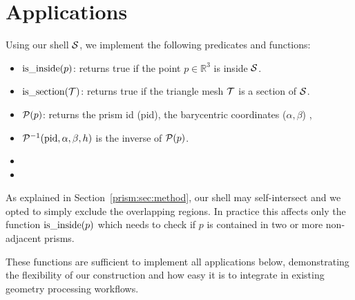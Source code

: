 \section{Applications}
\label{prism:sec:applications}
Using our shell $\S$, we implement the following predicates and functions:
\begin{itemize}
    \item $\isinside(p)$: returns true if the point $p \in \mathbb{R}^3$ is inside $\S$. %
    \item $\issection(\T)$: returns true if the triangle mesh $\T$ is a section of $\S$.
    \item $\P(p)$: returns the prism id (pid), the barycentric coordinates ($\alpha,\beta$) , 
    \item $\P^{-1}(\text{pid},\alpha,\beta,h)$ is the inverse of $\P(p)$.
    \item {}
    \item {}
\end{itemize}

As explained in Section~\ref{prism:sec:method}, our shell may self-intersect and 
we opted to simply exclude the overlapping regions. In practice this affects only the function $\isinside(p)$ which needs to check if $p$ is contained in two or more non-adjacent prisms. 

These functions are sufficient to implement all applications below, demonstrating the flexibility of our construction and how easy it is to integrate in existing geometry processing workflows. %



